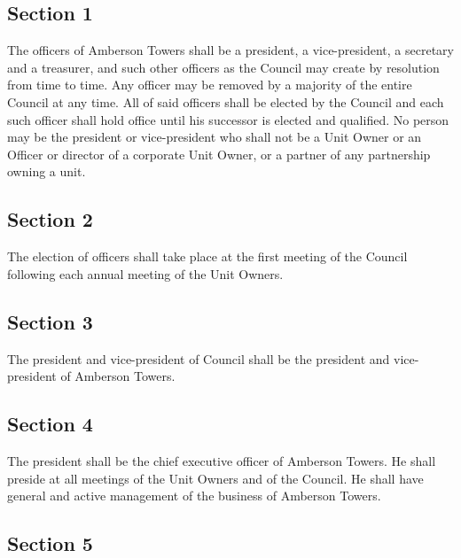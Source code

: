 \documentclass[
  14pt,
]{book}
\begin{document}
\hypertarget{section-1-5}{%
\subsection*{Section 1}\label{section-1-5}}

The officers of Amberson Towers shall be a president, a vice-president, a secretary and a treasurer, and such other officers as the Council may create by resolution from time to time. Any officer may be removed by a majority of the entire Council at any time. All of said officers shall be elected by the Council and each such officer shall hold office until his successor is elected and qualified. No person may be the president or vice-president who shall not be a Unit Owner or an Officer or director of a corporate Unit Owner, or a partner of any partnership owning a unit.

\hypertarget{section-2-5}{%
\subsection*{Section 2}\label{section-2-5}}

The election of officers shall take place at the first meeting of the Council following each annual meeting of the Unit Owners.

\hypertarget{section-3-2}{%
\subsection*{Section 3}\label{section-3-2}}

The president and vice-president of Council shall be the president and vice-president of Amberson Towers.

\hypertarget{section-4-2}{%
\subsection*{Section 4}\label{section-4-2}}

The president shall be the chief executive officer of Amberson Towers. He shall preside at all meetings of the Unit Owners and of the Council. He shall have general and active management of the business of Amberson Towers.

\hypertarget{section-5-2}{%
\subsection*{Section 5}\label{section-5-2}}
\end{document}
